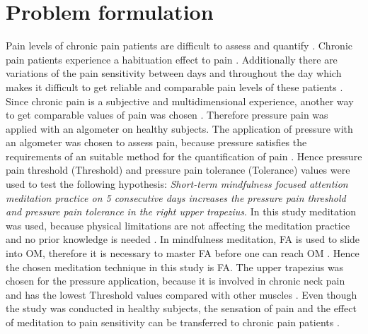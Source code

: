 \chapter{Problem formulation}

Pain levels of chronic pain patients are difficult to assess and quantify \cite{Younger2010, Dansie2013}. Chronic pain patients experience a habituation effect to pain \cite{Bingel2007}. Additionally there are variations of the pain sensitivity between days and throughout the day which makes it difficult to get reliable and comparable pain levels of these patients \cite{Breivik2006}. Since chronic pain is a subjective and multidimensional experience, another way to get comparable values of pain was chosen \cite{Ebert2010}. Therefore pressure pain was applied with an algometer on healthy subjects. The application of pressure with an algometer was chosen to assess pain, because pressure satisfies the requirements of an suitable method for the quantification of pain \cite{Keele1954}. Hence pressure pain threshold (Threshold) and pressure pain tolerance (Tolerance) values were used to test the following hypothesis:
\textit{Short-term mindfulness focused attention meditation practice on 5 consecutive days increases the pressure pain threshold and pressure pain tolerance in the right upper trapezius}. In this study meditation was used, because physical limitations are not affecting the meditation practice and no prior knowledge is needed \cite{Tang2017}. In mindfulness meditation, FA is used to slide into OM, therefore it is necessary to master FA before one can reach OM \cite{Zeidan2016, Kabat1982, Perlman2010}. Hence the chosen meditation technique in this study is FA. The upper trapezius was chosen for the pressure application, because it is involved in chronic neck pain and has the lowest Threshold values compared with other muscles \cite{Falla2004,Fischer1987}. Even though the study was conducted in healthy subjects, the sensation of pain and the effect of meditation to pain sensitivity can be transferred to chronic pain patients \cite{Kjogx2016}.


